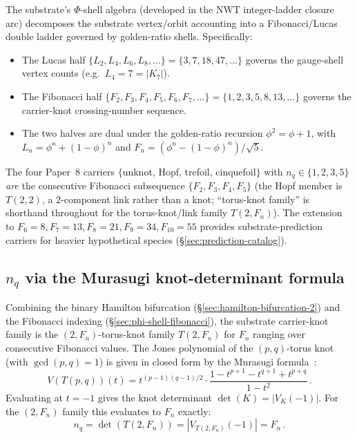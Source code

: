 \documentclass[11pt]{article}
\begin{document}
The substrate's $\Phi$-shell algebra (developed in the NWT integer-ladder closure arc) decomposes the substrate vertex/orbit accounting into a Fibonacci/Lucas double ladder governed by golden-ratio shells.  Specifically:
\begin{itemize}
\item The Lucas half $\{L_2, L_4, L_6, L_8, \ldots\} = \{3, 7, 18, 47, \ldots\}$ governs the gauge-shell vertex counts (e.g.\ $L_4 = 7 = |K_7|$).
\item The Fibonacci half $\{F_2, F_3, F_4, F_5, F_6, F_7, \ldots\} = \{1, 2, 3, 5, 8, 13, \ldots\}$ governs the carrier-knot crossing-number sequence.
\item The two halves are dual under the golden-ratio recursion $\phi^2 = \phi + 1$, with $L_n = \phi^n + (1 - \phi)^n$ and $F_n = (\phi^n - (1 - \phi)^n) / \sqrt{5}$.
\end{itemize}
The four Paper~8 carriers $\{$unknot, Hopf, trefoil, cinquefoil$\}$ with $n_q \in \{1, 2, 3, 5\}$ \emph{are} the consecutive Fibonacci subsequence $\{F_2, F_3, F_4, F_5\}$ (the Hopf member is $T(2, 2)$, a $2$-component link rather than a knot; ``torus-knot family'' is shorthand throughout for the torus-knot/link family $T(2, F_n)$).  The extension to $F_6 = 8, F_7 = 13, F_8 = 21, F_9 = 34, F_{10} = 55$ provides substrate-prediction carriers for heavier hypothetical species (\S\ref{sec:prediction-catalog}).

\subsection{$n_q$ via the Murasugi knot-determinant formula}
\label{sec:nq-murasugi}

Combining the binary Hamilton bifurcation (\S\ref{sec:hamilton-bifurcation-2}) and the Fibonacci indexing (\S\ref{sec:phi-shell-fibonacci}), the substrate carrier-knot family is the $(2, F_n)$-torus-knot family $T(2, F_n)$ for $F_n$ ranging over consecutive Fibonacci values.  The Jones polynomial of the $(p, q)$-torus knot (with $\gcd(p, q) = 1$) is given in closed form by the Murasugi formula~\cite{Murasugi}:
\begin{equation}
  V(T(p, q))(t) = t^{(p - 1)(q - 1)/2} \cdot \frac{1 - t^{p + 1} - t^{q + 1} + t^{p + q}}{1 - t^2} \, .
  \label{eq:murasugi}
\end{equation}
Evaluating at $t = -1$ gives the knot determinant $\det(K) = |V_K(-1)|$.  For the $(2, F_n)$ family this evaluates to $F_n$ exactly:
\begin{equation}
  \boxed{n_q = \det(T(2, F_n)) = |V_{T(2, F_n)}(-1)| = F_n \, .}
  \label{eq:nq-fibonacci}
\end{equation}
\end{document}
